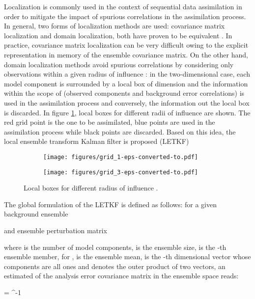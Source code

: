 \documentclass[12pt]{article}
\newcommand{\Nens}{N} \newcommand{\Nobs}{m} \newcommand{\Nstate}{n} \newcommand{\X}{{\bf X}} \newcommand{\x}{{\bf x}} \newcommand{\J}{\mathcal{J}} \newcommand{\lp}{\left (} \newcommand{\rp}{\right )} \newcommand{\lb}{\left [} \newcommand{\rb}{\right ]} \renewcommand{\ln}{\left \|} \newcommand{\rn}{\right \|}
\begin{document}
Localization is commonly used in the context of sequential data assimilation in order to mitigate the impact of spurious correlations in the assimilation process. In general, two forms of localization methods are used: covariance matrix localization and domain localization, both have proven to be equivalent \cite{localization_methods}. In practice, covariance matrix localization can be very difficult owing to the explicit representation in memory of the ensemble covariance matrix. On the other hand, domain localization methods avoid spurious correlations by considering only observations within a given radius of influence : in the two-dimensional case, each model component is surrounded by a local box of dimension  and the information within the scope of  (observed components and background error correlations) is used in the assimilation process and conversely, the information out the local box is discarded. In figure \ref{fig:local-boxes}, local boxes for different radii of influence  are shown. The red grid point is the one to be assimilated, blue points are used in the assimilation process while black points are discarded. Based on this idea, the local ensemble transform Kalman filter is proposed (LETKF) \cite{TELA:TELA076} 
\begin{figure}[htp]
\centering
\begin{subfigure}[b]{0.45\textwidth}
\centering
\texttt{[image: figures/grid\_1-eps-converted-to.pdf]}
\caption{}
\end{subfigure}\hspace{1em}
\begin{subfigure}[b]{0.45\textwidth}
\centering
\texttt{[image: figures/grid\_3-eps-converted-to.pdf]}
\caption{}
\end{subfigure}
\caption{Local boxes for different radius of influence .}
\label{fig:local-boxes}
\end{figure}
The global formulation of the LETKF is defined as follows: for a given background ensemble

and ensemble perturbation matrix

where  is the number of model components,  is the ensemble size,  is the -th ensemble member, for ,  is the ensemble mean,  is the -th dimensional vector whose components are all ones and  denotes the outer product of two vectors, an estimated of the analysis error covariance matrix in the ensemble space reads:

 = \lb \lp \Nens-1\rp \cdot \I_{\Nens \times \Nens} + \Z^T \cdot \R^{-1} \cdot \Z \rb^{-1}
\end{document}

